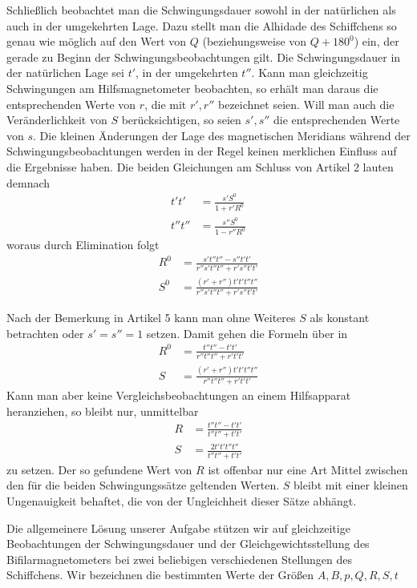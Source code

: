 Schließlich beobachtet man die Schwingungsdauer sowohl in der natürlichen als auch in der umgekehrten Lage. Dazu stellt man die Alhidade des Schiffchens so genau wie möglich auf den Wert von $Q$ (beziehungsweise von $Q+180^0$) ein, der gerade zu Beginn der Schwingungsbeobachtungen gilt. Die Schwingungsdauer in der natürlichen Lage sei $t'$, in der umgekehrten $t''$. Kann man gleichzeitig Schwingungen am Hilfsmagnetometer beobachten, so erhält man daraus die entsprechenden Werte von $r$, die mit $r',r''$ bezeichnet seien. Will man auch die Veränderlichkeit von $S$ berücksichtigen, so seien $s',s''$ die entsprechenden Werte von $s$. Die kleinen Änderungen der Lage des magnetischen Meridians während der Schwingungsbeobachtungen
werden in der Regel keinen merklichen Einfluss auf die Ergebnisse haben. Die beiden Gleichungen am Schluss von Artikel 2 lauten demnach
\[
\begin{aligned}
t't'&=\frac{s'S^0}{1+r'R^0}\\
t''t''&=\frac{s''S^0}{1-r''R^0}
\end{aligned}
\]
woraus durch Elimination folgt
\[
\begin{aligned}
R^0&=\frac{s't''t''-s''t't'}{r''s't''t''+r's''t't'}\\
S^0&=\frac{(r'+r'')t't't''t''}{r''s't''t''+r's''t't'}
\end{aligned}
\]

Nach der Bemerkung in Artikel 5 kann man ohne Weiteres $S$ als konstant betrachten oder $s'=s''=1$ setzen. Damit gehen die Formeln über in
\[
\begin{aligned}
R^0&=\frac{t''t''-t't'}{r''t''t''+r't't'}\\
S&=\frac{(r'+r'')t't't''t''}{r''t''t''+r't't'}
\end{aligned}
\]
Kann man aber keine Vergleichsbeobachtungen an einem Hilfsapparat heranziehen, so bleibt nur, unmittelbar
\[
\begin{aligned}
R&=\frac{t''t''-t't'}{t''t''+t't'}\\
S&=\frac{2t't't''t''}{t''t''+t't'}
\end{aligned}
\]
zu setzen. Der so gefundene Wert von $R$ ist offenbar nur eine Art Mittel zwischen den für die beiden Schwingungssätze geltenden Werten. $S$ bleibt mit einer kleinen Ungenauigkeit behaftet, die von der Ungleichheit dieser Sätze abhängt.

Die allgemeinere Lösung unserer Aufgabe stützen wir auf gleichzeitige Beobachtungen der Schwingungsdauer und der Gleichgewichtsstellung des Bifilarmagnetometers bei zwei beliebigen verschiedenen Stellungen des Schiffchens. Wir bezeichnen die bestimmten Werte der Größen $A,B,p,Q,R,S,t$

